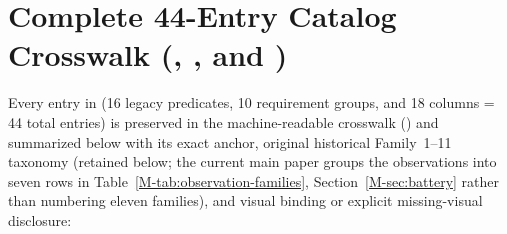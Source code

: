 \section{Complete 44-Entry Catalog Crosswalk (, , and )}
\label{sup:crosswalk-44}

Every entry in  (16  legacy predicates, 10  requirement groups, and 18  columns = 44 total entries) is preserved in the machine-readable crosswalk () and summarized below with its exact  anchor, original historical Family~1--11 taxonomy (retained below; the current main paper groups the observations into seven rows in Table~\ref{M-tab:observation-families}, Section~\ref{M-sec:battery} rather than numbering eleven families), and visual binding or explicit missing-visual disclosure:

